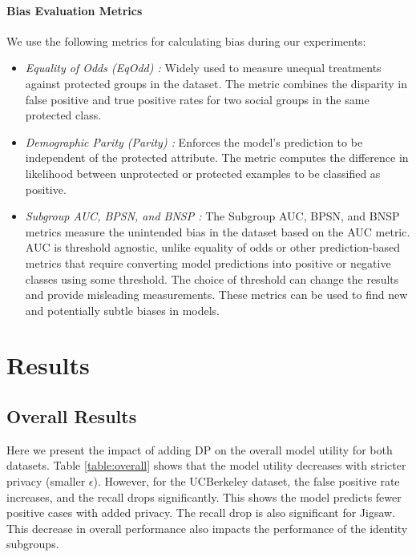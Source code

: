 \documentclass[11pt]{article} %
\begin{document}
\paragraph{Bias Evaluation Metrics} \label{app:bias}
We use the following metrics for calculating bias during our experiments:
\begin{itemize}
    \item \textit{Equality of Odds (EqOdd) \cite{hardt2016equality}:} Widely used to measure unequal treatments against protected groups in the dataset. The metric combines the disparity in false positive and true positive rates for two social groups in the same protected class.
    
    \item \textit{Demographic Parity (Parity) \cite{hardt2016equality}:} Enforces the model's prediction to be independent of the protected attribute. The metric computes the difference in likelihood between unprotected or protected examples to be classified as positive. 

    \item \textit{Subgroup AUC, BPSN, and BNSP \cite{borkan2019nuanced}:} The Subgroup AUC, BPSN, and BNSP metrics measure the unintended bias in the dataset based on the AUC metric. AUC is threshold agnostic, unlike equality of odds or other prediction-based metrics that require converting model predictions into positive or negative classes using some threshold. The choice of threshold can change the results and provide misleading measurements. These metrics can be used to find new and potentially subtle biases in models.
\end{itemize}

\section{Results \label{sec:results}}

\subsection{Overall Results}

Here we present the impact of adding DP on the overall model utility for both datasets. Table \ref{table:overall} shows that the model utility decreases with stricter privacy (smaller $\epsilon$). However, for the UCBerkeley dataset, the false positive rate increases, and the recall drops significantly. This shows the model predicts fewer positive cases with added privacy. The recall drop is also significant for Jigsaw. This decrease in overall performance also impacts the performance of the identity subgroups.
\end{document}
